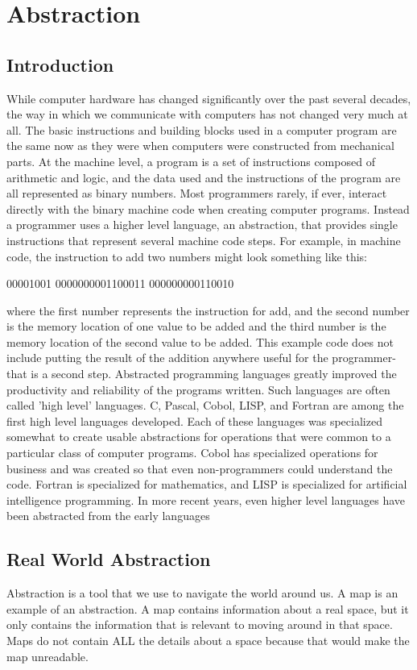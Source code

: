 \chapter{Abstraction}

\section{Introduction}
While computer hardware has changed significantly over the past several decades, the way in which we communicate with computers has not changed very much at all. The basic instructions and building blocks used in a computer program are the same now as they were when computers were constructed from mechanical parts.
At the machine level, a program is a set of instructions composed of arithmetic and logic, and the data used and the instructions of the program are all represented as binary numbers. Most programmers rarely, if ever, interact directly with the binary machine code when creating computer programs. Instead a programmer uses a higher level language, an abstraction, that provides single instructions that represent several machine code steps.
For example, in machine code, the instruction to add two numbers might look something like this:

00001001 0000000001100011 000000000110010

where the first number represents the instruction for add, and the second number is the memory location of one value to be added and the third number is the memory location of the second value to be added. This example code does not include putting the result of the addition anywhere useful for the programmer- that is a second step.
Abstracted programming languages greatly improved the productivity and reliability of the programs written. Such languages are often called 'high level' languages. C, Pascal, Cobol, LISP, and Fortran are among the first high level languages developed. Each of these languages was specialized somewhat to create usable abstractions for operations that were common to a particular class of computer programs. Cobol has specialized operations for business and was created so that even non-programmers could understand the code. Fortran is specialized for mathematics, and LISP is specialized for artificial intelligence programming.
In more recent years, even higher level languages have been abstracted from the early languages



\section{Real World Abstraction}
Abstraction is a tool that we use to navigate the world around us. A map is an example of an abstraction. A map contains information about a real space, but it only contains the information that is relevant to moving around in that space. Maps do not contain ALL the details about a space because that would make the map unreadable.

